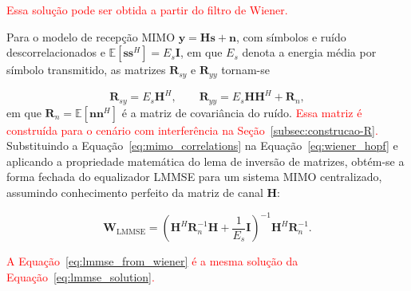 \textcolor{red}{Essa solução pode ser obtida a partir do filtro de Wiener.}

Para o modelo de recepção MIMO $\mathbf{y}=\mathbf{H}\mathbf{s}+\mathbf{n}$, com símbolos e ruído
descorrelacionados e $\mathbb{E}[\mathbf{s}\mathbf{s}^H]=E_s\mathbf{I}$, em
que $E_s$ denota a energia média por símbolo transmitido, as matrizes
$\mathbf{R}_{sy}$ e $\mathbf{R}_{yy}$ tornam-se

\begin{equation}
\mathbf{R}_{sy}=E_s\mathbf{H}^H,
\qquad
\mathbf{R}_{yy}=E_s\mathbf{H}\mathbf{H}^H+\mathbf{R}_n,
\label{eq:mimo_correlations}
\end{equation}
em que $\mathbf{R}_n=\mathbb{E}[\mathbf{n}\mathbf{n}^H]$ é a matriz de
covariância do ruído. \textcolor{red}{Essa matriz é construída para o cenário com interferência na Seção~{\hypersetup{linkcolor=red}\ref{subsec:construcao-R}}.}
Substituindo a Equação~\eqref{eq:mimo_correlations} na
Equação~\eqref{eq:wiener_hopf} e aplicando a propriedade matemática do lema de inversão de matrizes,
obtém-se a forma fechada do equalizador LMMSE para um sistema MIMO
centralizado, assumindo conhecimento perfeito da matriz de canal $\mathbf{H}$:

\begin{equation}
\mathbf{W}_\text{LMMSE}=
\left(\mathbf{H}^H\mathbf{R}_n^{-1}\mathbf{H}+\frac{1}{E_s}\mathbf{I}\right)^{-1}
\mathbf{H}^H\mathbf{R}_n^{-1}.
\label{eq:lmmse_from_wiener}
\end{equation}

\textcolor{red}{A Equação~{\hypersetup{linkcolo=red}\eqref{eq:lmmse_from_wiener}} é a mesma solução da Equação~{\hypersetup{linkcolor=red}\eqref{eq:lmmse_solution}}.}
